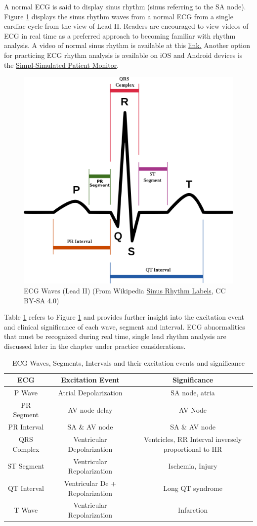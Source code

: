 A normal ECG is said to display sinus rhythm (sinus referring to the SA node). Figure \ref{fig:ECG} displays the sinus rhythm waves from a normal ECG from a single cardiac cycle from the view of Lead II. Readers are encouraged to view videos of ECG in real time as a preferred approach to becoming familiar with rhythm analysis. A video of normal sinus rhythm is available at this \href{https://youtu.be/Q0JMfIVaDUE?list=PLNN6HI4OXQmyOMNWWrQCCQP559lvbcy4b}{link.} Another option for practicing ECG rhythm analysis is available on iOS and Android devices is the \href{https://simplsim.com/}{Simpl-Simulated Patient Monitor}.

\begin{figure}[!h]
    \centering
    \includegraphics[width=0.5\linewidth]{./figure/ECG.png}
    \caption{ECG Waves (Lead II) \footnotesize{(From Wikipedia  \href{https://commons.wikimedia.org/wiki/File:SinusRhythmLabels.svg}{Sinus Rhythm Labels}, CC BY-SA 4.0)}}
    \label{fig:ECG}
\end{figure}

Table \ref{ECGWaves} refers to Figure \ref{fig:ECG} and provides further insight into the excitation event and clinical significance of each wave, segment and interval. ECG abnormalities that must be recognized during real time, single lead rhythm analysis are discussed later in the chapter under practice considerations.

\begin{table}[h!]
\centering
\begin{tabular}{||c c c ||} 
 \hline
 ECG & Excitation Event & Significance \\ [0.5ex] 
 \hline\hline
 P Wave & Atrial Depolarization & SA node, atria \\ 
 PR Segment & AV node delay & AV Node  \\
  PR Interval & SA \& AV node & SA \& AV node  \\
 QRS Complex & Ventricular Depolarization & Ventricles, RR Interval inversely proportional to HR  \\
 ST Segment & Ventricular Repolarization & Ischemia, Injury  \\
 QT Interval & Ventricular De + Repolarization & Long QT syndrome  \\ 
 T Wave & Ventricular Repolarization & Infarction \\ [1ex] 
 \hline
\end{tabular}
\caption{ECG Waves, Segments, Intervals and their excitation events and significance}
\label{ECGWaves}
\end{table}


